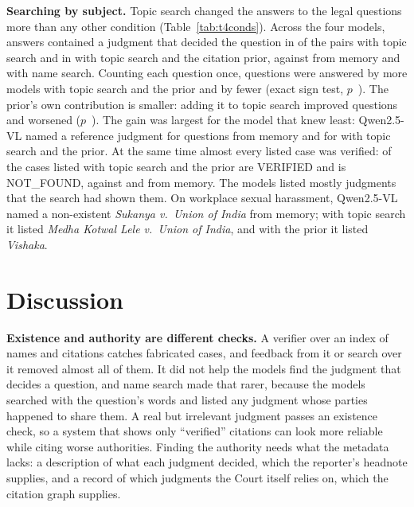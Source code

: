 \documentclass[conference]{IEEEtran}
\begin{document}
\textbf{Searching by subject.} Topic search changed the answers to the legal questions more than any other condition (Table~\ref{tab:t4conds}). Across the four models, answers contained a judgment that decided the question in \RefAllTopic{} of the \RefQuestionsAll{} pairs with topic search and in \RefAllTopicPrior{} with topic search and the citation prior, against \RefAllClosed{} from memory and \RefAllName{} with name search. Counting each question once, \SignClosedTopicPriorBetter{} questions were answered by more models with topic search and the prior and \SignClosedTopicPriorWorse{} by fewer (exact sign test, $p$~\SignClosedTopicPriorP). The prior's own contribution is smaller: adding it to topic search improved \SignTopicTopicPriorBetter{} questions and worsened \SignTopicTopicPriorWorse{} ($p$~\SignTopicTopicPriorP). The gain was largest for the model that knew least: Qwen2.5-VL named a reference judgment for \RefClosedQwenVL{} questions from memory and for \RefTopicPriorQwenVL{} with topic search and the prior. At the same time almost every listed case was verified: \VerPctAllTopicPrior{} of the \CasesAllTopicPrior{} cases listed with topic search and the prior are VERIFIED and \NFAllTopicPrior{} is NOT\_FOUND, against \VerPctAllClosed{} and \NFAllClosed{} from memory. The models listed mostly judgments that the search had shown them. On workplace sexual harassment, Qwen2.5-VL named a non-existent \emph{Sukanya v.\ Union of India} from memory; with topic search it listed \emph{Medha Kotwal Lele v.\ Union of India}, and with the prior it listed \emph{Vishaka}.





\section{Discussion}
\label{sec:discussion}
\textbf{Existence and authority are different checks.} A verifier over an index of names and citations catches fabricated cases, and feedback from it or search over it removed almost all of them. It did not help the models find the judgment that decides a question, and name search made that rarer, because the models searched with the question's words and listed any judgment whose parties happened to share them. A real but irrelevant judgment passes an existence check, so a system that shows only ``verified'' citations can look more reliable while citing worse authorities. Finding the authority needs what the metadata lacks: a description of what each judgment decided, which the reporter's headnote supplies, and a record of which judgments the Court itself relies on, which the citation graph supplies.
\end{document}
